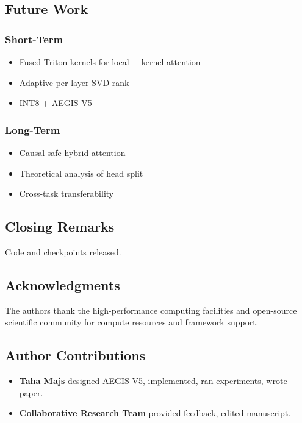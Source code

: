 \subsection{Future Work}

\subsubsection{Short-Term}
\begin{itemize}
\item Fused Triton kernels for local + kernel attention
\item Adaptive per-layer SVD rank
\item INT8 + AEGIS-V5

\end{itemize}
\subsubsection{Long-Term}
\begin{itemize}
\item Causal-safe hybrid attention
\item Theoretical analysis of head split
\item Cross-task transferability

\end{itemize}
\subsection{Closing Remarks}

Code and checkpoints released.

\subsection{Acknowledgments}

The authors thank the high-performance computing facilities and open-source scientific community for compute resources and framework support.

\subsection{Author Contributions}

\begin{itemize}
\item \textbf{Taha Majs} designed AEGIS-V5, implemented, ran experiments, wrote
  paper.
\item \textbf{Collaborative Research Team} provided feedback, edited manuscript.

\end{itemize}
